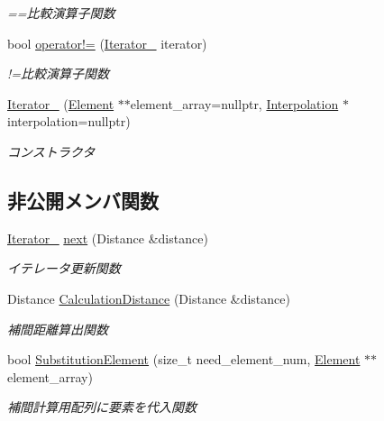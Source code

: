 \begin{DoxyCompactItemize}
\begin{DoxyCompactList}\small\item\em ==比較演算子関数 \end{DoxyCompactList}\item 
bool \mbox{\hyperlink{class_interpolation_1_1_iterator___a60ad4c8de6408cac63947d0c11db011a}{operator!=}} (\mbox{\hyperlink{class_interpolation_1_1_iterator__}{Iterator\+\_\+}} iterator)
\begin{DoxyCompactList}\small\item\em !=比較演算子関数 \end{DoxyCompactList}\item 
\mbox{\hyperlink{class_interpolation_1_1_iterator___a6d4d602b7d46bd9882944de310dc9696}{Iterator\+\_\+}} (\mbox{\hyperlink{class_interpolation_a01e71544809483d7a2ee72fe0007bcb0}{Element}} $\ast$$\ast$element\+\_\+array=nullptr, \mbox{\hyperlink{class_interpolation}{Interpolation}} $\ast$interpolation=nullptr)
\begin{DoxyCompactList}\small\item\em コンストラクタ \end{DoxyCompactList}\end{DoxyCompactItemize}
\subsection*{非公開メンバ関数}
\begin{DoxyCompactItemize}
\item 
\mbox{\hyperlink{class_interpolation_1_1_iterator__}{Iterator\+\_\+}} \mbox{\hyperlink{class_interpolation_1_1_iterator___ae7872acdf3be40953a070e4c84a0e8a1}{next}} (Distance \&distance)
\begin{DoxyCompactList}\small\item\em イテレータ更新関数 \end{DoxyCompactList}\item 
Distance \mbox{\hyperlink{class_interpolation_1_1_iterator___a74cc0e2ed214dbda534e7d69aab89394}{Calculation\+Distance}} (Distance \&distance)
\begin{DoxyCompactList}\small\item\em 補間距離算出関数 \end{DoxyCompactList}\item 
bool \mbox{\hyperlink{class_interpolation_1_1_iterator___a8e886db816553a1d9f0c573e87f7a715}{Substitution\+Element}} (size\+\_\+t need\+\_\+element\+\_\+num, \mbox{\hyperlink{class_interpolation_a01e71544809483d7a2ee72fe0007bcb0}{Element}} $\ast$$\ast$element\+\_\+array)
\begin{DoxyCompactList}\small\item\em 補間計算用配列に要素を代入関数 \end{DoxyCompactList}\end{DoxyCompactItemize}
